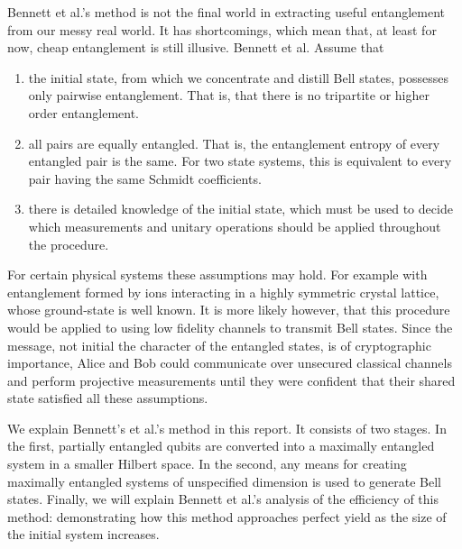 Bennett et al.'s method is not the final world in extracting useful entanglement from our messy real world.
It has shortcomings, which mean that, at least for now, cheap entanglement is still illusive. 
Bennett et al. Assume that
\begin{enumerate}
	\item the initial state, from which we concentrate and distill Bell states, possesses only pairwise entanglement. That is, that there is no tripartite or higher order entanglement.
	\item all pairs are equally entangled. That is, the entanglement entropy of every entangled pair is the same. For two state systems, this is equivalent to every pair having the same Schmidt coefficients.
	\item there is detailed knowledge of the initial state, which must be used to decide which measurements and unitary operations should be applied throughout the procedure. 
\end{enumerate}

For certain physical systems these assumptions may hold. 
For example with entanglement formed by ions interacting in a highly symmetric crystal lattice, whose ground-state is well known.
It is more likely however, that this procedure would be applied to using low fidelity channels to transmit Bell states.
Since the message, not initial the character of the entangled states, is of cryptographic importance, Alice and Bob could communicate over unsecured classical channels and perform projective measurements until they were confident that their shared state satisfied all these assumptions.

We explain Bennett's et al.'s method in this report.
It consists of two stages.
In the first, partially entangled qubits are converted into a maximally entangled system in a smaller Hilbert space.
In the second, any means for creating maximally entangled systems of unspecified dimension is used to generate Bell states.
Finally, we will explain Bennett et al.'s analysis of the efficiency of this method: demonstrating how this method approaches perfect yield as the size of the initial system increases.
